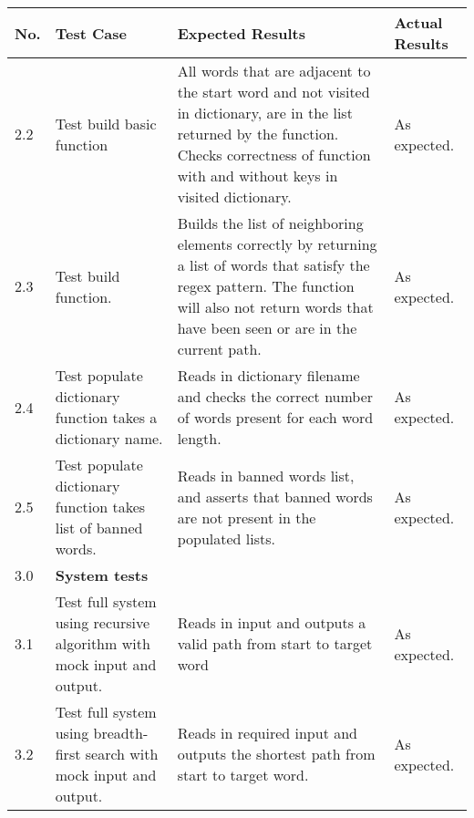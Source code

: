 \documentclass[12pt, a4]{report}
\begin{document}
	\pagebreak[4]
	
	\begin{tabular}{ |p{0.5cm}|p{5cm}|p{5cm}|p{5cm}| } 
		\hline
		No. & Test Case & Expected Results & Actual Results \\
		\hline
		2.2 & Test build basic function & All words that are adjacent to the start word and not visited in dictionary, are in the list returned by the function. Checks correctness of function with and without keys in visited dictionary. & As expected. \\
		2.3 & Test build function. & Builds the list of neighboring elements correctly by returning a list of words that satisfy the regex pattern. The function will also not return words that have been seen or are in the current path.  & As expected.\\
		2.4 & Test populate dictionary function takes a dictionary name. & Reads in dictionary filename and checks the correct number of words present for each word length. & As expected. \\
		2.5 & Test populate dictionary function takes list of banned words. & Reads in banned words list, and asserts that banned words are not present in the populated lists. & As expected. \\
		3.0 & \textbf{System tests} &  &  \\
		3.1 & Test full system using recursive algorithm with mock input and output. & Reads in input and outputs a valid path from start to target word & As expected. \\
		3.2 & Test full system using breadth-first search with mock input and output. & Reads in required input and outputs the shortest path from start to target word. & As expected. \\
		\hline
	\end{tabular}
	\newpage
\end{document}
